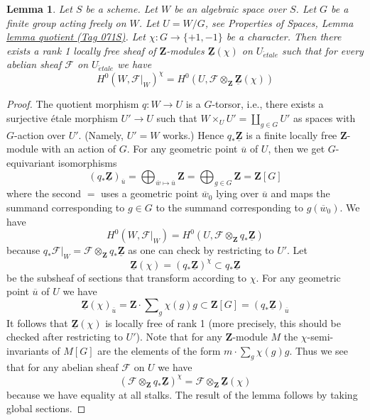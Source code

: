 \documentclass{amsart}
\theoremstyle{plain}
\newtheorem{lemma}[subsection]{Lemma}
\theoremstyle{definition}
\theoremstyle{remark}
\numberwithin{equation}{subsection}
\def\etale{{\acute{e}tale}}
\begin{document}
\begin{lemma}
\label{lemma-twist}
Let $S$ be a scheme. Let $W$ be an algebraic space over $S$.
Let $G$ be a finite group acting freely on $W$.
Let $U = W/G$, see
Properties of Spaces, Lemma \href{https://stacks.math.columbia.edu/tag/071S}{lemma quotient (Tag 071S)}.
Let $\chi : G \to \{+1, -1\}$ be a character.
Then there exists a rank 1 locally free sheaf of $\mathbf{Z}$-modules
$\underline{\mathbf{Z}}(\chi)$ on $U_\etale$ such that for every
abelian sheaf $\mathcal{F}$ on $U_\etale$ we have
$$
H^0(W, \mathcal{F}|_W)^\chi =
H^0(U, \mathcal{F} \otimes_{\mathbf{Z}} \underline{\mathbf{Z}}(\chi))
$$
\end{lemma}

\begin{proof}
The quotient morphism $q : W \to U$ is a $G$-torsor, i.e., there exists
a surjective \'etale morphism $U' \to U$ such that
$W \times_U U' = \coprod_{g \in G} U'$ as spaces with $G$-action over $U'$.
(Namely, $U' = W$ works.) Hence $q_*\underline{\mathbf{Z}}$ is a finite
locally free $\mathbf{Z}$-module with an action of $G$. For any
geometric point $\overline{u}$ of $U$, then we get $G$-equivariant
isomorphisms
$$
(q_*\underline{\mathbf{Z}})_{\overline{u}}
= \bigoplus\nolimits_{\overline{w} \mapsto \overline{u}} \mathbf{Z}
= \bigoplus\nolimits_{g \in G} \mathbf{Z} = \mathbf{Z}[G]
$$
where the second $=$ uses a geometric point
$\overline{w}_0$ lying over $\overline{u}$ and
maps the summand corresponding to $g \in G$ to the summand
corresponding to $g(\overline{w}_0)$. We have
$$
H^0(W, \mathcal{F}|_W) =
H^0(U, \mathcal{F} \otimes_\mathbf{Z} q_*\underline{\mathbf{Z}})
$$
because
$q_*\mathcal{F}|_W = \mathcal{F} \otimes_\mathbf{Z} q_*\underline{\mathbf{Z}}$
as one can check by restricting to $U'$. Let
$$
\underline{\mathbf{Z}}(\chi) =
(q_*\underline{\mathbf{Z}})^\chi \subset
q_*\underline{\mathbf{Z}}
$$
be the subsheaf of sections that transform according to $\chi$. For
any geometric point $\overline{u}$ of $U$ we have
$$
\underline{\mathbf{Z}}(\chi)_{\overline{u}} =
\mathbf{Z} \cdot \sum\nolimits_g \chi(g) g
\subset
\mathbf{Z}[G] = (q_*\underline{\mathbf{Z}})_{\overline{u}}
$$
It follows that $\underline{\mathbf{Z}}(\chi)$ is locally free of
rank 1 (more precisely, this should be checked after restricting to $U'$).
Note that for any $\mathbf{Z}$-module $M$ the $\chi$-semi-invariants
of $M[G]$ are the elements of the form $m \cdot \sum\nolimits_g \chi(g) g$.
Thus we see that for any abelian sheaf $\mathcal{F}$ on $U$ we have
$$
\left(\mathcal{F} \otimes_\mathbf{Z} q_*\underline{\mathbf{Z}}\right)^\chi
=
\mathcal{F} \otimes_\mathbf{Z} \underline{\mathbf{Z}}(\chi)
$$
because we have equality at all stalks. The result of the lemma follows by
taking global sections.
\end{proof}
\end{document}
